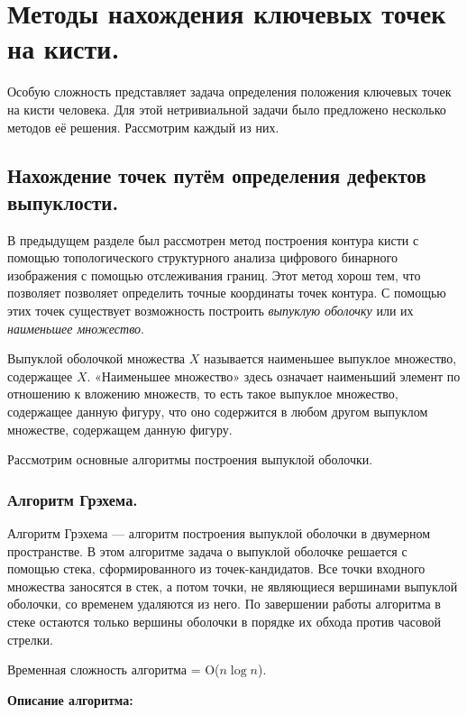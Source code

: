 \section{Методы нахождения ключевых точек на кисти.}

Особую сложность представляет задача 
определения положения ключевых точек на кисти человека.
Для этой нетривиальной задачи было предложено
несколько методов её решения. Рассмотрим каждый из них.

\subsection{Нахождение точек путём определения дефектов 
выпуклости.}

В предыдущем разделе был рассмотрен метод построения контура
кисти с помощью топологического структурного анализа
цифрового бинарного изображения с помощью отслеживания
границ. Этот метод хорош тем, что позволяет позволяет
определить точные координаты точек контура. С помощью этих
точек существует возможность построить {\it выпуклую
оболочку} или их {\it наименьшее множество}.

Выпуклой оболочкой множества $X$ называется наименьшее
выпуклое множество, содержащее $X$. 
«Наименьшее множество» здесь означает наименьший элемент по
отношению к вложению множеств, то есть такое выпуклое
множество, содержащее данную фигуру, что оно содержится в
любом другом выпуклом множестве, содержащем данную фигуру.

Рассмотрим основные алгоритмы построения выпуклой оболочки.

\subsubsection{Алгоритм Грэхема.}

Алгоритм Грэхема\cite{graham} — алгоритм построения выпуклой
оболочки в двумерном пространстве. В этом алгоритме задача о
выпуклой оболочке решается с помощью стека, сформированного
из точек-кандидатов. Все точки входного множества заносятся в
стек, а потом точки, не являющиеся вершинами выпуклой
оболочки, со временем удаляются из него. По завершении работы
алгоритма в стеке остаются только вершины оболочки в порядке
их обхода против часовой стрелки.

Временная сложность алгоритма = O($n\log{n}$).

{\bf Описание алгоритма:}

